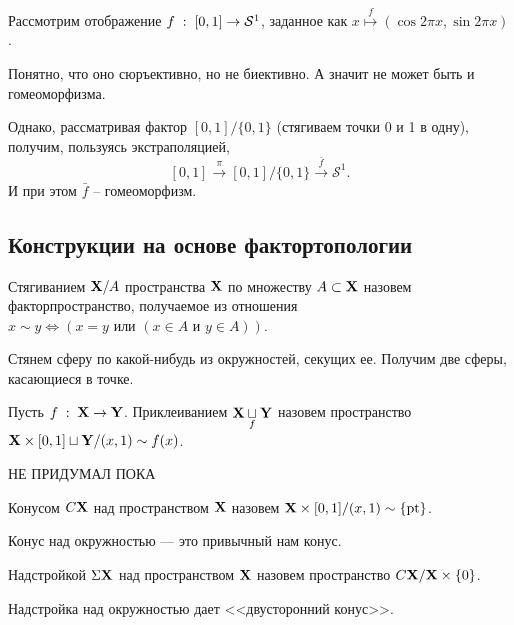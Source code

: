 \begin{Ex}
    Рассмотрим отображение $f\; : \; [0,1] \to \mathcal{S}^1$, заданное как $x \overset{f}{\mapsto} (\cos 2\pi x, \sin 2\pi x)$.
    
    Понятно, что оно сюръективно, но не биективно. А значит не может быть и гомеоморфизма.

    Однако, рассматривая фактор $[0,1] / \{0,1\}$ (стягиваем точки 0 и 1 в одну), получим, пользуясь экстраполяцией,
     \[
         [0,1] \overset{\pi}{\to} [0,1] / \{0,1\} \overset{\bar{f}}{\to} \mathcal{S}^1.
    \] 
    И при этом $\bar{f}$ -- гомеоморфизм.
\end{Ex}

\subsection{Конструкции на основе фактортопологии}
\begin{Def}
    [Стягивание]
    Стягиванием $\mathbf{X} / A$ пространства  $\mathbf{X}$ по множеству $A \subset \mathbf{X}$ назовем факторпространство, получаемое из отношения $x\sim y \Leftrightarrow (x=y \text{ или } (x\in A \text{ и } y \in A))$. 
\end{Def}
\begin{Ex}
    Стянем сферу по какой-нибудь из окружностей, секущих ее. Получим две сферы, касающиеся в точке.
\end{Ex}

\begin{Def}
    [Приклеивание]
    Пусть $f\; : \; \mathbf{X} \to  \mathbf{Y}$. Приклеиванием $\mathbf{X} \underset{f}{\sqcup} \mathbf{Y}$ назовем пространство $\mathbf{X} \times [0,1] \sqcup \mathbf{Y} / (x,1) \sim f(x)$.
\end{Def}
\begin{Ex}
    НЕ ПРИДУМАЛ ПОКА
\end{Ex}
\begin{Def}
    [Конус]
    Конусом $C\mathbf{X}$ над пространством $\mathbf{X}$ назовем $\mathbf{X} \times [0,1] / (x,1) \sim \{\mathrm{pt}\}$.
\end{Def}
\begin{Ex}
    Конус над окружностью --- это привычный нам конус.
\end{Ex}

\begin{Def}
    [Надстройка]
    Надстройкой $\Sigma \mathbf{X}$ над пространством $\mathbf{X}$ назовем пространство $C\mathbf{X} / \mathbf{X} \times \{0\}$.
\end{Def}

\begin{Ex}
    Надстройка над окружностью дает <<двусторонний конус>>.
\end{Ex}
